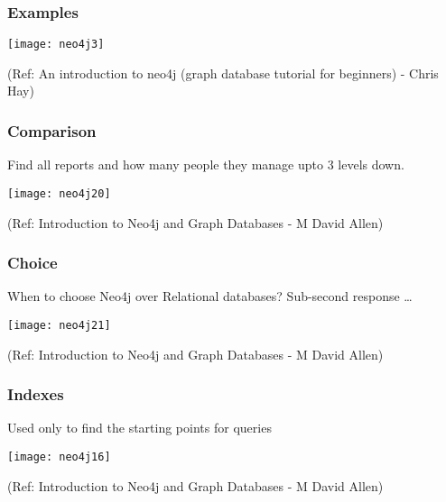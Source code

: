 \begin{frame}[fragile]\frametitle{Examples}


\begin{center}
\texttt{[image: neo4j3]}
\end{center}	

{\tiny (Ref: An introduction to neo4j (graph database tutorial for beginners) - Chris Hay)}

\end{frame}

\begin{frame}[fragile]\frametitle{Comparison}
Find all reports and how many people they manage upto 3 levels down.

\begin{center}
\texttt{[image: neo4j20]}
\end{center}	    

{\tiny (Ref: Introduction to Neo4j and Graph Databases
 - M David Allen)}

\end{frame}

\begin{frame}[fragile]\frametitle{Choice}
When to choose Neo4j over Relational databases? Sub-second response \ldots


\begin{center}
\texttt{[image: neo4j21]}
\end{center}	    

{\tiny (Ref: Introduction to Neo4j and Graph Databases
 - M David Allen)}

\end{frame}


\begin{frame}[fragile]\frametitle{Indexes}
Used only to find the starting points for queries

\begin{center}
\texttt{[image: neo4j16]}
\end{center}	  


{\tiny (Ref: Introduction to Neo4j and Graph Databases
 - M David Allen)}

\end{frame}

